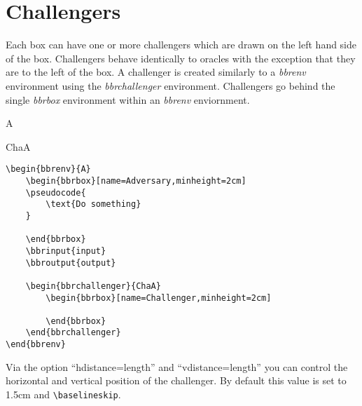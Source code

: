 \documentclass[a4paper]{report}
\begin{document}
\section{Challengers}
Each box can have one or more challengers which are drawn on the left hand side of the box. Challengers
behave identically to oracles with the exception that they are to the left of the box. A challenger
is created similarly to a \emph{bbrenv} environment using the \emph{bbrchallenger} environment. Challengers
go behind the single \emph{bbrbox} environment within an \emph{bbrenv} enviornment.

\begin{bbrenv}{A}
	\begin{bbrbox}[name=Adversary,minheight=2cm]

	\end{bbrbox}

	\begin{bbrchallenger}{ChaA}
		\begin{bbrbox}[name=Challenger,minheight=2cm]
		
		\end{bbrbox}
	\end{bbrchallenger}
\end{bbrenv}


\begin{lstlisting}
\begin{bbrenv}{A}
	\begin{bbrbox}[name=Adversary,minheight=2cm]
	\pseudocode{
		\text{Do something} 
	}

	\end{bbrbox}
	\bbrinput{input}
	\bbroutput{output}

	\begin{bbrchallenger}{ChaA}
		\begin{bbrbox}[name=Challenger,minheight=2cm]
		
		\end{bbrbox}
	\end{bbrchallenger}
\end{bbrenv}
\end{lstlisting}
Via the option \enquote{hdistance=length} and \enquote{vdistance=length} you can control the horizontal and vertical position of the challenger. By default this value is set to 1.5cm and \lstinline$\baselineskip$.
\end{document}
